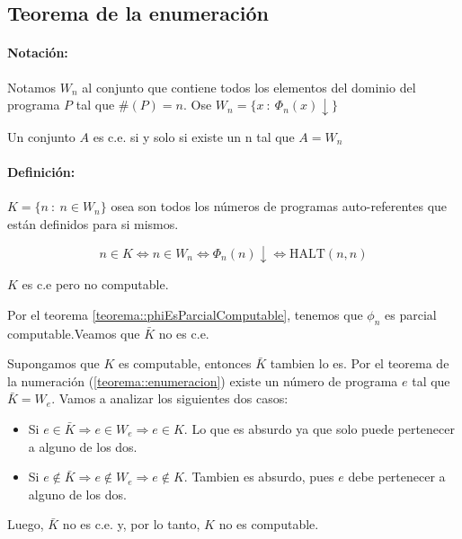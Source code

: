 \subsection{Teorema de la enumeración}

\paragraph{Notación:} Notamos $W_n$ al conjunto que contiene todos los elementos del dominio del programa $P$ tal que $\#(P) = n$. Ose $W_n = \{ x~:~\Phi_n(x)\downarrow\}$

\begin{teorema}\label{teorema::enumeracion}
Un conjunto $A$ es c.e. si y solo si existe un n tal que $A = W_n$
\end{teorema}

\paragraph{Definición:} $K = \{ n~:~n\in W_n\}$ osea son todos los números de programas auto-referentes que están definidos para si mismos. 

$$ n \in K \iff n \in W_n \iff \Phi_n(n)\downarrow \iff \text{HALT}(n,n)$$

\begin{teorema}
	$K$ es c.e pero no computable.
\end{teorema}

\begin{demo}
	Por el teorema \ref{teorema::phiEsParcialComputable}, tenemos que $\phi_n$ es parcial computable.Veamos que $\bar{K}$ no es c.e.
	
	Supongamos que $K$ es computable, entonces $\bar{K}$ tambien lo es. Por el teorema de la numeración (\ref{teorema::enumeracion}) existe un número de programa $e$ tal que $\bar{K} = W_e$. Vamos a analizar los siguientes dos casos:
	
	\begin{itemize}
		\item Si $e \in \bar{K} \Rightarrow e \in W_e \Rightarrow e \in K$. Lo que es absurdo ya que solo puede pertenecer a alguno de los dos.
		\item Si $e \notin \bar{K} \Rightarrow e \notin W_e \Rightarrow e \notin K$. Tambien es absurdo, pues $e$ debe pertenecer a alguno de los dos.
	\end{itemize}
	
	Luego, $\bar{K}$ no es c.e. y, por lo tanto, $K$ no es computable.
\end{demo}

